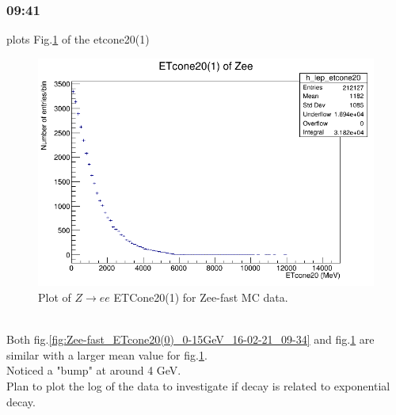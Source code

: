 \subsubsection*{09:41}
plots Fig.\ref{fig:Zee-fast_ETcone20(1)_0-15GeV_16-02-21_09-41} of the etcone20(1)
\begin{figure}[h!]
    \centering
	\includegraphics[width=0.85\linewidth]{plots/16-02-2021/Zee-fast_ETcone20(1)_ 0-15GeV_16-02-21_09-41.png}
	\caption{Plot of  $Z \rightarrow ee$ ETCone20(1) for Zee-fast MC data.}\label{fig:Zee-fast_ETcone20(1)_0-15GeV_16-02-21_09-41}
\end{figure}
\\
Both fig.\ref{fig:Zee-fast_ETcone20(0)_0-15GeV_16-02-21_09-34} and fig.\ref{fig:Zee-fast_ETcone20(1)_0-15GeV_16-02-21_09-41} are similar with a larger mean value for fig.\ref{fig:Zee-fast_ETcone20(1)_0-15GeV_16-02-21_09-41}. 
\\
Noticed a "bump" at around 4 GeV.
\\
Plan to plot the log of the data to investigate if decay is related to exponential decay.

